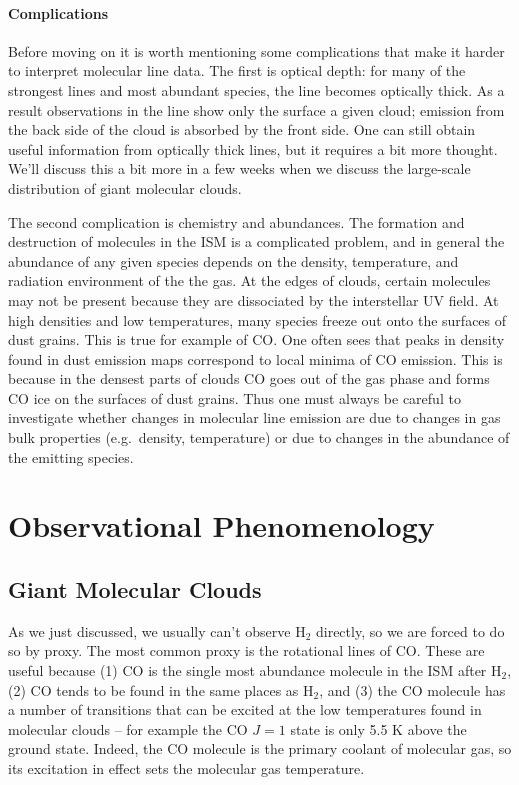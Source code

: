 \paragraph{Complications}

Before moving on it is worth mentioning some complications that make it harder to interpret molecular line data. The first is optical depth: for many of the strongest lines and most abundant species, the line becomes optically thick. As a result observations in the line show only the surface a given cloud; emission from the back side of the cloud is absorbed by the front side. One can still obtain useful information from optically thick lines, but it requires a bit more thought. We'll discuss this a bit more in a few weeks when we discuss the large-scale distribution of giant molecular clouds.

The second complication is chemistry and abundances. The formation and destruction of molecules in the ISM is a complicated problem, and in general the abundance of any given species depends on the density, temperature, and radiation environment of the the gas. At the edges of clouds, certain molecules may not be present because they are dissociated by the interstellar UV field. At high densities and low temperatures, many species freeze out onto the surfaces of dust grains. This is true for example of CO. One often sees that peaks in density found in dust emission maps correspond to local minima of CO emission. This is because in the densest parts of clouds CO goes out of the gas phase and forms CO ice on the surfaces of dust grains.  Thus one must always be careful to investigate whether changes in molecular line emission are due to changes in gas bulk properties (e.g.\ density, temperature) or due to changes in the abundance of the emitting species.


\section{Observational Phenomenology}

\subsection{Giant Molecular Clouds}

As we just discussed, we usually can't observe H$_2$ directly, so we are forced to do so by proxy. The most common proxy is the rotational lines of CO. These are useful because (1) CO is the single most abundance molecule in the ISM after H$_2$, (2) CO tends to be found in the same places as H$_2$, and (3) the CO molecule has a number of transitions that can be excited at the low temperatures found in molecular clouds -- for example the CO $J=1$ state is only 5.5 K above the ground state. Indeed, the CO molecule is the primary coolant of molecular gas, so its excitation in effect sets the molecular gas temperature. 

